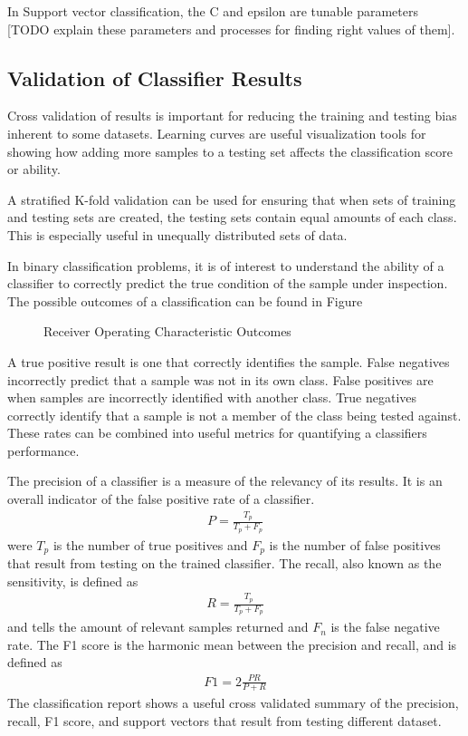 In Support vector classification, the C and epsilon are tunable parameters [TODO explain these parameters and processes for finding right values of them].
\subsection{Validation of Classifier Results}
Cross validation of results is important for reducing the training and testing bias inherent to some datasets.  Learning curves are useful visualization tools for showing how adding more samples to a testing set affects the classification score or ability.

A stratified K-fold validation can be used for ensuring that when sets of training and testing sets are created, the testing sets contain equal amounts of each class.  This is especially useful in unequally distributed sets of data.

In binary classification problems, it is of interest to understand the ability of a classifier to correctly predict the true condition of the sample under inspection.  The possible outcomes of a classification can be found in Figure
\begin{figure}
    \begin{center}
    \end{center}
    \caption{Receiver Operating Characteristic Outcomes}
    \label{fig:polarization}
\end{figure}
A true positive result is one that correctly identifies the sample.  False negatives incorrectly predict that a sample was not in its own class.  False positives are when samples are incorrectly identified with another class.  True negatives correctly identify that a sample is not a member of the class being tested against.   These rates can be combined into useful metrics for quantifying a classifiers performance.

The precision of a classifier is a measure of the relevancy of its results.  It is an overall indicator of the false positive rate of a classifier.
%
\begin{align}
    P = \frac{T_p}{T_p + F_p}
\end{align}
%
were $T_p$ is the number of true positives and $F_p$ is the number of false positives that result from testing on the trained classifier.  The recall, also known as the sensitivity, is defined as
%
\begin{align}
    R = \frac{T_p}{T_p + F_p}
\end{align}
%
and tells the amount of relevant samples returned and $F_n$ is the false negative rate.  The F1 score is the harmonic mean between the precision and recall, and is defined as
%
\begin{align}
    F1 = 2\frac{PR}{P + R}
\end{align}
%
The classification report shows a useful cross validated summary of the precision, recall, F1 score, and support vectors that result from testing different dataset.


